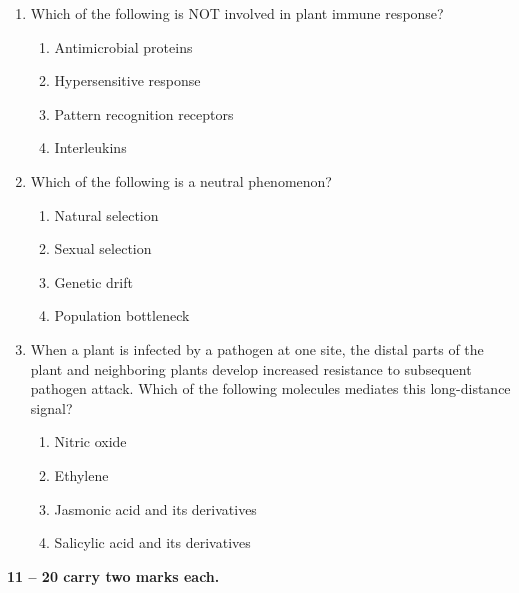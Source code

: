 \documentclass[journal,12pt,onecolumn]{IEEEtran}
\begin{document}
\begin{enumerate}[label=\arabic*.]
\item Which of the following is NOT involved in plant immune response?

\begin{multicols}{2}
\begin{enumerate}[label=(\Alph*)]
\item Antimicrobial proteins
\item Hypersensitive response
\item Pattern recognition receptors
\item Interleukins
\end{enumerate}
\end{multicols}

\item Which of the following is a neutral phenomenon?

\begin{multicols}{2}
\begin{enumerate}[label=(\Alph*)]
\item Natural selection
\item Sexual selection
\item Genetic drift
\item Population bottleneck
\end{enumerate}
\end{multicols}

\item When a plant is infected by a pathogen at one site, the distal parts of the plant and neighboring plants develop increased resistance to subsequent pathogen attack. Which of the following molecules mediates this long-distance signal?

\begin{multicols}{2}
\begin{enumerate}[label=(\Alph*)]
\item Nitric oxide
\item Ethylene
\item Jasmonic acid and its derivatives
\item Salicylic acid and its derivatives
\end{enumerate}
\end{multicols}

\end{enumerate}

\vspace{0.5cm}
\noindent \textbf{ 11 -- 20 carry two marks each.}
\end{document}
